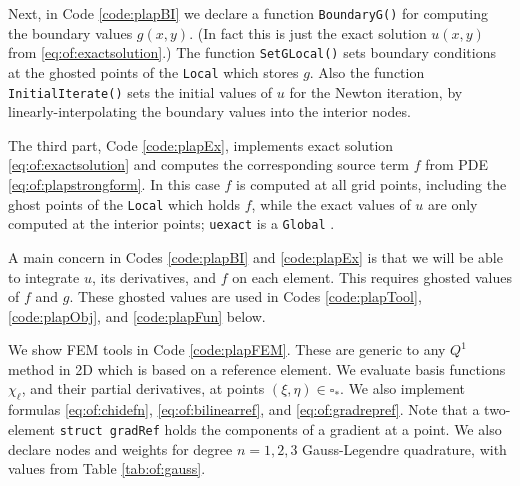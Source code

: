
Next, in Code \ref{code:plapBI} we declare a function \texttt{BoundaryG()} for computing the boundary values $g(x,y)$.  (In fact this is just the exact solution $u(x,y)$ from \eqref{eq:of:exactsolution}.)  The function \texttt{SetGLocal()} sets boundary conditions at the ghosted points of the \texttt{Local} \pVec which stores $g$.  Also the function \texttt{InitialIterate()} sets the initial values of $u$ for the Newton iteration, by linearly-interpolating the boundary values into the interior nodes.

The third part, Code \ref{code:plapEx}, implements exact solution \eqref{eq:of:exactsolution} and computes the corresponding source term $f$ from PDE \eqref{eq:of:plapstrongform}.  In this case $f$ is computed at all grid points, including the ghost points of the \texttt{Local} \pVec which holds $f$, while the exact values of $u$ are only computed at the interior points; \texttt{uexact} is a \texttt{Global} \pVec.

A main concern in Codes \ref{code:plapBI} and \ref{code:plapEx} is that we will be able to integrate $u$, its derivatives, and $f$ on each element.  This requires ghosted values of $f$ and $g$.  These ghosted values are used in Codes \ref{code:plapTool}, \ref{code:plapObj}, and \ref{code:plapFun} below.


We show FEM tools in Code \ref{code:plapFEM}.  These are generic to any $Q^1$ method in 2D which is based on a reference element.  We evaluate basis functions $\chi_\ell$, and their partial derivatives, at points $(\xi,\eta) \in \square_\ast$.  We also implement formulas \eqref{eq:of:chidefn}, \eqref{eq:of:bilinearref}, and \eqref{eq:of:gradrepref}.  Note that a two-element \texttt{struct gradRef} holds the components of a gradient at a point.  We also declare nodes and weights for degree $n=1,2,3$ Gauss-Legendre quadrature, with values from Table \ref{tab:of:gauss}.


